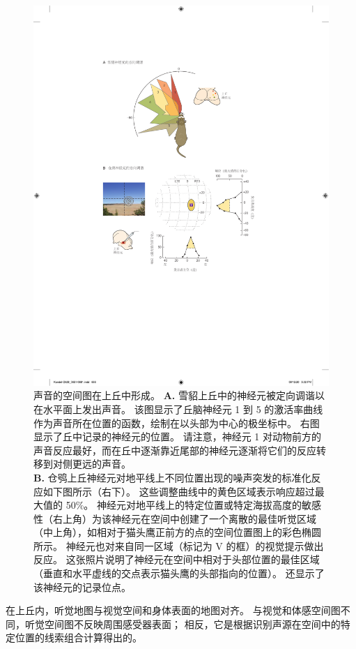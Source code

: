 \begin{figure}[htbp]
	\centering
	\includegraphics[width=0.8\linewidth]{chap28/fig_28_8}
	\caption{声音的空间图在上丘中形成。 
		\textbf{A.} 雪貂上丘中的神经元被定向调谐以在水平面上发出声音。
		该图显示了丘脑神经元 1 到 5 的激活率曲线作为声音所在位置的函数，绘制在以头部为中心的极坐标中。
		右图显示了丘中记录的神经元的位置。 
		请注意，神经元 1 对动物前方的声音反应最好，而在丘中逐渐靠近尾部的神经元逐渐将它们的反应转移到对侧更远的声音\cite{king1999sensory}。\\
		\textbf{B.} 仓鸮上丘神经元对地平线上不同位置出现的噪声突发的标准化反应如下图所示（右下）。
		这些调整曲线中的黄色区域表示响应超过最大值的 50\%。
		神经元对地平线上的特定位置或特定海拔高度的敏感性（右上角）为该神经元在空间中创建了一个离散的最佳听觉区域（中上角），如相对于猫头鹰正前方的点的空间位置图上的彩色椭圆所示。
		神经元也对来自同一区域（标记为 V 的框）的视觉提示做出反应。
		这张照片说明了神经元在空间中相对于头部位置的最佳区域（垂直和水平虚线的交点表示猫头鹰的头部指向的位置）。
		还显示了该神经元的记录位点\cite{cohen1999maps}。}
	\label{fig:28_8}
\end{figure}


在上丘内，听觉地图与视觉空间和身体表面的地图对齐。
与视觉和体感空间图不同，听觉空间图不反映周围感受器表面；
相反，它是根据识别声源在空间中的特定位置的线索组合计算得出的。


